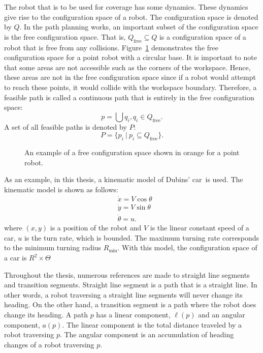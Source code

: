 \documentclass[../main.tex]{subfiles}
\begin{document}
The robot that is to be used for coverage has some dynamics. These dynamics give rise to the configuration space of a robot. The configuration space is denoted by $Q$. In the path planning works, an important subset of the configuration space is the free configuration space. That is, $Q_{\text{free}}\subseteq Q$ is a configuration space of a robot that is free from any collisions. Figure~\ref{fig:configuration_space} demonstrates the free configuration space for a point robot with a circular base. It is important to note that some areas are not accessible such as the corners of the workspace. Hence, these areas are not in the free configuration space since if a robot would attempt to reach these points, it would collide with the workspace boundary. Therefore, a feasible path is called a continuous path that is entirely in the free configuration space:
\begin{equation}
	p=\bigcup q_i, q_i\in Q_{\text{free}}.
\end{equation}
A set of all feasible paths is denoted by $P$:
\begin{equation}
	P=\{p_i\ |\ p_i\subseteq Q_{\text{free}}\}.
\end{equation}

\begin{figure}
	\centering
	
	\caption{An example of a free configuration space shown in orange for a point robot.}
	\label{fig:configuration_space}
\end{figure}

As an example, in this thesis, a kinematic model of Dubins' car~\cite{dubins1957curves}is used. The kinematic model is shown as follows:
\begin{equation}
	\begin{aligned}
		& \dot{x}=V\cos{\theta}\\
		& \dot{y}=V\sin{\theta}\\
		& \dot{\theta}=u.
	\end{aligned}
\end{equation}
where $(x,y)$ is a position of the robot and $V$ is the linear constant speed of a car, $u$ is the turn rate, which is bounded. The maximum turning rate corresponds to the minimum turning radius $R_{\min}$. With this model, the configuration space of a car is $R^2\times\Theta$

Throughout the thesis, numerous references are made to straight line segments and transition segments. Straight line segment is a path that is a straight line. In other words, a robot traversing a straight line segments will never change its heading. On the other hand, a transition segment is a path where the robot does change its heading. A path $p$ has a linear component, $\ell(p)$ and an angular component, $a(p)$. The linear component is the total distance traveled by a robot traversing $p$. The angular component is an accumulation of heading changes of a robot traversing $p$.
\end{document}
